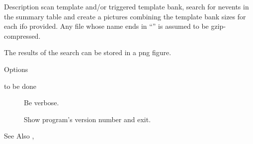 \begin{manpage}{}


\begin{mansection}{Description}
 scan template and/or triggered template bank, 
search for nevents in the summary table and create a pictures combining 
the template bank sizes for each ifo provided.  Any file whose name ends
in ``'' is assumed to be gzip-compressed.

The results of the search can be stored in a png figure.
\end{mansection}

\begin{mansection}{Options}
\begin{description}
\item[to be done]

\item[] Be verbose.

\item[] Show program's version number and exit.

\end{description}
\end{mansection}

\begin{mansection}{See Also}
, 
\end{mansection}

\end{manpage}
